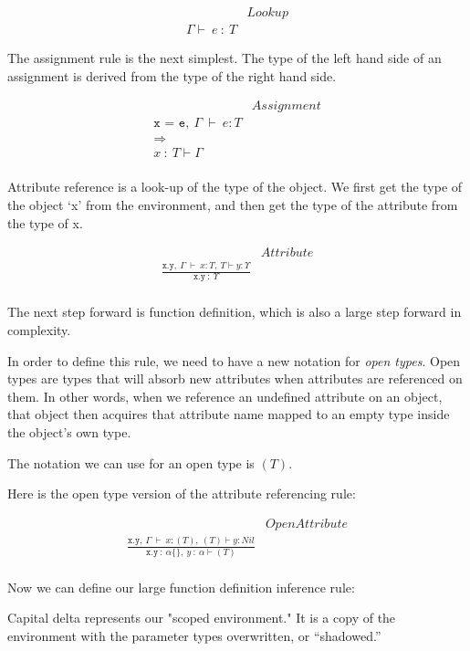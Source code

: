 \documentclass{article}
\begin{document}
\begin{align*}
&Lookup\\
\Gamma \vdash\ e\ :\ T
\end{align*}

The assignment rule is the next simplest. The type of the left hand side of an
assignment is derived from the type of the right hand side.

\begin{align*}
&Assignment\\
\texttt{x = e},\ \Gamma\ \vdash\ e:T\\
\Longrightarrow \\
x\ :\ T \vdash \Gamma \\
\end{align*}

Attribute reference is a look-up of the type of the object. We first get the
type of the object `x' from the environment, and then get the type of the
attribute from the type of x.

\begin{align*}
&Attribute\\
\frac{\texttt{x.y},\ \Gamma\ \vdash\ x:T,\ T \vdash y:\Upsilon} {\texttt{x.y}\ :\ \Upsilon} \\
\end{align*}

The next step forward is function definition, which is also a large step forward in complexity.

In order to define this rule, we need to have a new notation for \emph{open
types}. Open types are types that will absorb new attributes when attributes
are referenced on them. In other words, when we reference an undefined
attribute on an object, that object then acquires that attribute name mapped to
an empty type inside the object's own type.

The notation we can use for an open type is $(T)$.

Here is the open type version of the attribute referencing rule:

\begin{align*}
&OpenAttribute\\
\frac{\texttt{x.y},\ \Gamma\ \vdash\ x:(T),\ (T) \vdash y:Nil}
{\texttt{x.y}\ :\ \alpha\{\},\ y\ :\ \alpha \vdash (T)} \\
\end{align*}

Now we can define our large function definition inference rule:

Capital delta represents our "scoped environment." It is a copy of the environment with the parameter types overwritten, or ``shadowed.''
\end{document}
